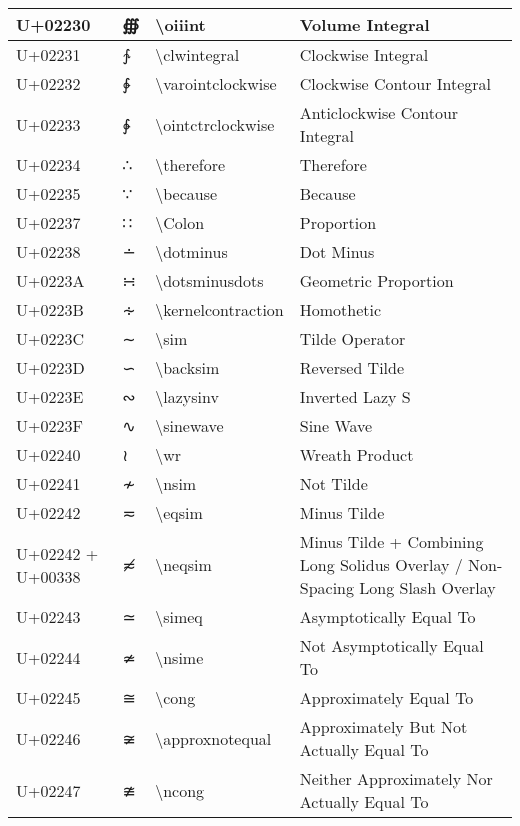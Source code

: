 \begin{table}[h]
\begin{tabulary}{\linewidth}{|L|L|L|L|}
\hline
U+02230 & ∰ & {\textbackslash}oiiint & Volume Integral \\
\hline
U+02231 & ∱ & {\textbackslash}clwintegral & Clockwise Integral \\
\hline
U+02232 & ∲ & {\textbackslash}varointclockwise & Clockwise Contour Integral \\
\hline
U+02233 & ∳ & {\textbackslash}ointctrclockwise & Anticlockwise Contour Integral \\
\hline
U+02234 & ∴ & {\textbackslash}therefore & Therefore \\
\hline
U+02235 & ∵ & {\textbackslash}because & Because \\
\hline
U+02237 & ∷ & {\textbackslash}Colon & Proportion \\
\hline
U+02238 & ∸ & {\textbackslash}dotminus & Dot Minus \\
\hline
U+0223A & ∺ & {\textbackslash}dotsminusdots & Geometric Proportion \\
\hline
U+0223B & ∻ & {\textbackslash}kernelcontraction & Homothetic \\
\hline
U+0223C & ∼ & {\textbackslash}sim & Tilde Operator \\
\hline
U+0223D & ∽ & {\textbackslash}backsim & Reversed Tilde \\
\hline
U+0223E & ∾ & {\textbackslash}lazysinv & Inverted Lazy S \\
\hline
U+0223F & ∿ & {\textbackslash}sinewave & Sine Wave \\
\hline
U+02240 & ≀ & {\textbackslash}wr & Wreath Product \\
\hline
U+02241 & ≁ & {\textbackslash}nsim & Not Tilde \\
\hline
U+02242 & ≂ & {\textbackslash}eqsim & Minus Tilde \\
\hline
U+02242 + U+00338 & ≂̸ & {\textbackslash}neqsim & Minus Tilde + Combining Long Solidus Overlay / Non-Spacing Long Slash Overlay \\
\hline
U+02243 & ≃ & {\textbackslash}simeq & Asymptotically Equal To \\
\hline
U+02244 & ≄ & {\textbackslash}nsime & Not Asymptotically Equal To \\
\hline
U+02245 & ≅ & {\textbackslash}cong & Approximately Equal To \\
\hline
U+02246 & ≆ & {\textbackslash}approxnotequal & Approximately But Not Actually Equal To \\
\hline
U+02247 & ≇ & {\textbackslash}ncong & Neither Approximately Nor Actually Equal To \\
\hline

\end{tabulary}
\end{table}
